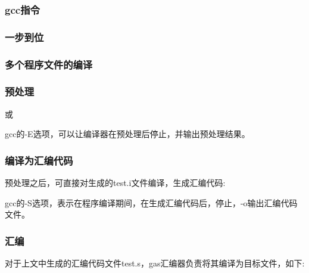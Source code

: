 \documentclass[letterpaper,12pt,english]{sphinxmanual}
\begin{document}
\subsubsection*{gcc指令}
\subsubsection*{一步到位}

\subsubsection*{多个程序文件的编译}

\subsubsection*{预处理}

\begin{DUlineblock}{0em}
\item[] 
\item[] 或
\item[] 
\item[] gcc的-E选项，可以让编译器在预处理后停止，并输出预处理结果。
\end{DUlineblock}
\subsubsection*{编译为汇编代码}

\begin{DUlineblock}{0em}
\item[] 预处理之后，可直接对生成的test.i文件编译，生成汇编代码:
\item[] 
\item[] gcc的-S选项，表示在程序编译期间，在生成汇编代码后，停止，-o输出汇编代码文件。
\end{DUlineblock}
\subsubsection*{汇编}

\begin{DUlineblock}{0em}
\item[] 对于上文中生成的汇编代码文件test.s，gas汇编器负责将其编译为目标文件，如下:
\item[] 
\end{DUlineblock}
\end{document}
